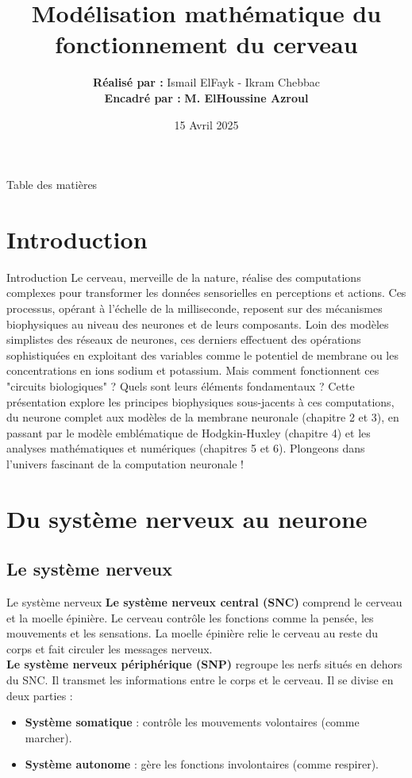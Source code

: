 \documentclass[10pt,french]{beamer}
\title{Modélisation mathématique du fonctionnement du cerveau}
\author{
	\textbf{Réalisé par :} Ismail ElFayk - Ikram Chebbac \\
	\textbf{Encadré par :} \textbf{M. ElHoussine Azroul}
}
\date{15 Avril 2025}
\institute{
	Master Mathématiques Appliquées et Systèmes Intelligents (MASI) \\
	Faculté des Sciences Dhar El Mehraz \\
	Université Sidi Mohammed Ben Abdellah
}
\begin{document}
	
	\maketitle
	
	\begin{frame}{Table des matières}
		\tableofcontents[hideothersubsections]
	\end{frame}
	
	\section[Intro]{Introduction}
	\begin{frame}{Introduction}
		\justifying
		Le cerveau, merveille de la nature, réalise des computations complexes pour transformer les données sensorielles en perceptions et actions. Ces processus, opérant à l’échelle de la milliseconde, reposent sur des mécanismes biophysiques au niveau des neurones et de leurs composants. Loin des modèles simplistes des réseaux de neurones, ces derniers effectuent des opérations sophistiquées en exploitant des variables comme le potentiel de membrane ou les concentrations en ions sodium et potassium. Mais comment fonctionnent ces "circuits biologiques" ? Quels sont leurs éléments fondamentaux ? Cette présentation explore les principes biophysiques sous-jacents à ces computations, du neurone complet aux modèles de la membrane neuronale (chapitre 2 et 3), en passant par le modèle emblématique de Hodgkin-Huxley (chapitre 4) et les analyses mathématiques et numériques (chapitres 5 et 6). Plongeons dans l’univers fascinant de la computation neuronale !
	\end{frame}
	
	\section{Du système nerveux au neurone}
	\subsection{Le système nerveux}
	\begin{frame}{Le système nerveux \cite{widmaier2008vanders}}
		\textbf{Le système nerveux central (SNC)} comprend le cerveau et la moelle épinière.  
		Le cerveau contrôle les fonctions comme la pensée, les mouvements et les sensations.  
		La moelle épinière relie le cerveau au reste du corps et fait circuler les messages nerveux.\\[1ex]
		
		\textbf{Le système nerveux périphérique (SNP)} regroupe les nerfs situés en dehors du SNC.  
		Il transmet les informations entre le corps et le cerveau.  
		Il se divise en deux parties :
		\begin{itemize}
			\item \textbf{Système somatique} : contrôle les mouvements volontaires (comme marcher).
			\item \textbf{Système autonome} : gère les fonctions involontaires (comme respirer).
		\end{itemize}
	\end{frame}
	
\end{document}
